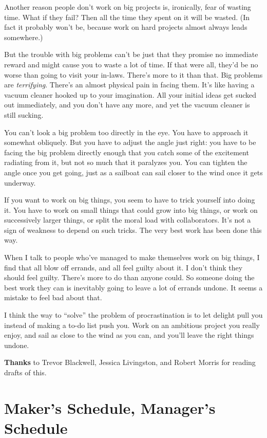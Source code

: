 \documentclass[12pt]{book}
\begin{document}
Another reason people don't work on big projects is, ironically, fear of
wasting time. What if they fail? Then all the time they spent on it will
be wasted. (In fact it probably won't be, because work on hard projects
almost always leads somewhere.)

But the trouble with big problems can't be just that they promise no
immediate reward and might cause you to waste a lot of time. If that
were all, they'd be no worse than going to visit your in-laws. There's
more to it than that. Big problems are \emph{terrifying}. There's an
almost physical pain in facing them. It's like having a vacuum cleaner
hooked up to your imagination. All your initial ideas get sucked out
immediately, and you don't have any more, and yet the vacuum cleaner is
still sucking.

You can't look a big problem too directly in the eye. You have to
approach it somewhat obliquely. But you have to adjust the angle just
right: you have to be facing the big problem directly enough that you
catch some of the excitement radiating from it, but not so much that it
paralyzes you. You can tighten the angle once you get going, just as a
sailboat can sail closer to the wind once it gets underway.

If you want to work on big things, you seem to have to trick yourself
into doing it. You have to work on small things that could grow into big
things, or work on successively larger things, or split the moral load
with collaborators. It's not a sign of weakness to depend on such
tricks. The very best work has been done this way.

When I talk to people who've managed to make themselves work on big
things, I find that all blow off errands, and all feel guilty about it.
I don't think they should feel guilty. There's more to do than anyone
could. So someone doing the best work they can is inevitably going to
leave a lot of errands undone. It seems a mistake to feel bad about
that.

I think the way to ``solve'' the problem of procrastination is to let
delight pull you instead of making a to-do list push you. Work on an
ambitious project you really enjoy, and sail as close to the wind as you
can, and you'll leave the right things undone.

\textbf{Thanks} to Trevor Blackwell, Jessica Livingston, and Robert
Morris for reading drafts of this.
\chapter{Maker's Schedule, Manager's Schedule }
\end{document}
